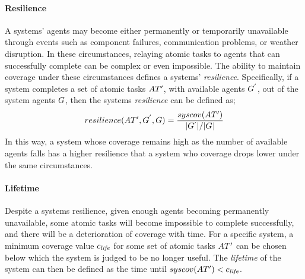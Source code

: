 \newcommand{\functionSymbolResilence}[2]{\functionSymbol{resilience}{#1}{#2}}
\newcommand{\functionResilence}[2]{
	\functionSignature{\functionSymbolResilence{#1}{#2}}
	{\setAtomicTaskInstance{}{}, \setAgent{}{'}, \setAgent{}{} }
}
\paragraph{Resilience}
\label{section:resilience}
A systems' agents may become either permanently or temporarily unavailable through events such as component failures, communication problems, or weather disruption. In these circumstances, relaying atomic tasks to agents that can successfully complete can be complex or even impossible.
 The ability to maintain coverage under these circumstances defines a systems' \textit{resilience}. Specifically, if a system completes a set of atomic tasks $\setAtomicTaskInstance{}{}$, with available agents $\setAgent{}{'}$, out of the system agents $\setAgent{}{}$, then the systems \textit{resilience} can be defined as; 
\begin{equation}
	\functionResilence{}{}
	= 
	\frac{
		\functionSystemCoverage{}{}
	}{
		\funcSize{\setAgents{}{'}} / \funcSize{\setAgents{}{}}
	}
\end{equation}
In this way, a system whose coverage remains high as the number of available agents falls has a higher resilience that a system who coverage drops lower under the same circumstances.


 \newcommand{\varCoverageMinimum}[2]{\varSymbol{c}{\textit{life}}{}}
 \paragraph{Lifetime}
 \label{section:lifetime}
 Despite a systems resilience, given enough agents becoming permanently unavailable, some atomic tasks will become impossible to complete successfully, and there will be a deterioration of coverage with time. For a specific system, a minimum coverage value $\varCoverageMinimum{}{}$ for some set of atomic tasks $\setAtomicTaskInstance{}{}$ can be chosen below which the system is judged to be no longer useful. The \textit{lifetime} of the system can then be defined as the time until $\functionSystemCoverage{}{} < \varCoverageMinimum{}{}$.
 
 
